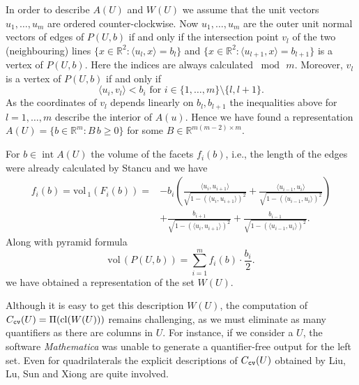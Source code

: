 \documentclass[11pt, a4paper, twoside, reqno]{amsart}
\DeclareMathOperator*{\cl}{cl}
\DeclareMathOperator*{\inter}{int}
\newcommand{\R}{\mathbb{R}}
\theoremstyle{definition}
\theoremstyle{remark}
\newcommand{\vol}{\mathrm{vol}\,}
\newcommand{\cv}{{\tt cv}}
\numberwithin{equation}{section}
\begin{document}
In order to describe $A(U)$ and $W(U)$ we assume that the 
unit vectors $u_1,\dots,u_m$ are ordered counter-clockwise.
Now  $u_1,\dots,u_m$ are the outer unit normal vectors of  edges of
$P(U,b)$ if and only if the intersection point $v_l$ of the two
(neighbouring) lines
$\{x\in\R^2 : \langle u_{l},x\rangle=b_{l}\}$ and  $\{x\in\R^2 : \langle u_{l+1},x\rangle=b_{l+1}\}$
is a vertex of $P(U,b)$. Here the indices are always calculated
$\bmod\, m$. Moreover, $v_l$ is a vertex of $P(U,b)$ if and only if
\begin{equation}
                 \langle u_i, v_l\rangle < b_i \text{ for } i\in\{1,\dots,m\}\setminus\{l,l+1\}.
\end{equation}
As the coordinates of $v_l$ depends linearly on $b_l, b_{l+1}$ the
inequalities above for $l=1,\dots,m$ describe the interior of
$A(u)$. Hence we have found a representation  $A(U)=\{b\in\R^m  :
B\,b\geq 0\}$ for some $B\in \R^{m(m-2)\times m}$.  

For $b\in\inter A(U)$ the volume of the facets $f_i(b)$, i.e., the length of the edges were already calculated 
by Stancu \cite[Remark 2.1]{stancu2002discrete} and %
we have
\begin{align}
    f_{i}(b) =  \vol_1(F_i(b))  = &- b_i \left( \frac{\langle u_i, u_{i+1} \rangle}{\sqrt{1 - (\langle u_i, u_{i+1} \rangle)^2}} + \frac{\langle u_{i-1}, u_{i} \rangle}{\sqrt{1 - (\langle u_{i-1}, u_{i} \rangle)^2}} \right)  \\
    & + \frac{b_{i+1}}{\sqrt{1 - (\langle u_i , u_{i+1} \rangle)^2}} + \frac{b_{i-1}}{\sqrt{1 - (\langle u_{i-1} , u_{i} \rangle)^2}}.
\end{align}
Along with pyramid formula
\begin{equation}
    \vol(P(U,b))=\sum_{i = 1}^m f_{i}(b) \cdot  \frac{b_i}{2}.
\end{equation}
we have obtained a representation of the set $W(U)$.

Although it is easy to get this description $W(U)$, the computation of
$C_\cv(U)=\Pi(\cl(W(U)))$ remains challenging, as we must eliminate as
many quantifiers as there are columns in $U$. For instance, if we
consider a $U$, the software \textit{Mathematica} \cite{Mathematica}
was unable to generate a quantifier-free output for the left set.
 Even for quadrilaterals the explicit descriptions of $C_\cv(U)$
obtained by  Liu, Lu, Sun and Xiong \cite{LiuLuSunEtAl2024} %
are quite involved.  
\end{document}
